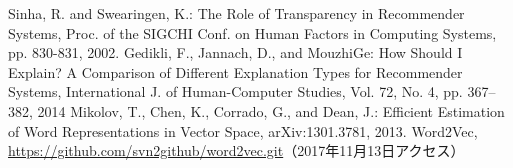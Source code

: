 {\footnotesize
\begin{thebibliography}{*}

 Sinha, R. and Swearingen, K.: The Role of Transparency in Recommender Systems, Proc. of the SIGCHI Conf. on Human Factors in Computing Systems, pp. 830-831, 2002.
 Gedikli, F., Jannach, D., and MouzhiGe: How Should I Explain? A Comparison of Different Explanation Types for Recommender Systems, International J. of Human-Computer Studies, Vol. 72, No. 4, pp. 367--382, 2014
 Mikolov, T., Chen, K., Corrado, G., and Dean, J.: Efficient Estimation of Word Representations in Vector Space, arXiv:1301.3781, 2013.
 Word2Vec, \url{https://github.com/svn2github/word2vec.git}（2017年11月13日アクセス）

\end{thebibliography}
}